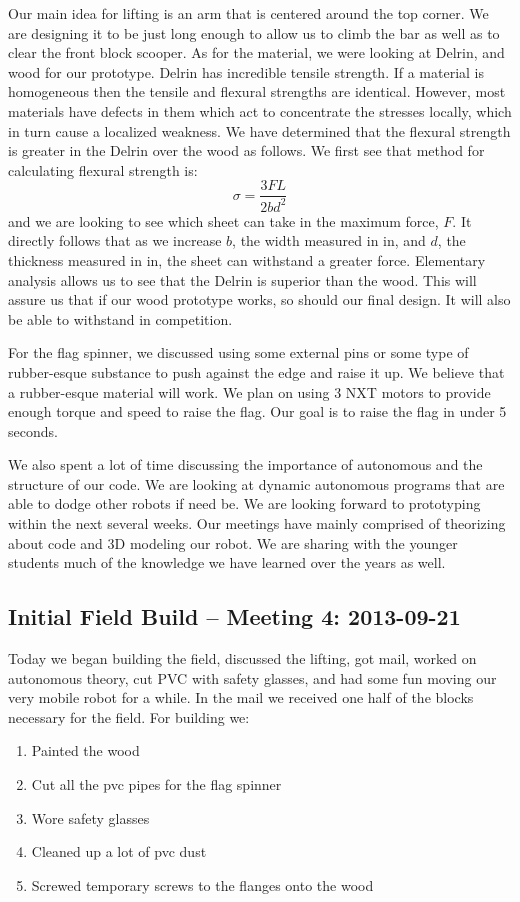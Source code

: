 \documentclass{article}
\begin{document}
Our main idea for lifting is an arm that is centered around the top corner. We are designing it to be just long enough to allow us to climb the bar as well as to clear the front block scooper. As for the material, we were looking at Delrin, and wood for our prototype. Delrin has incredible tensile strength. If a material is homogeneous then the tensile and flexural strengths are identical. However, most materials have defects in them which act to concentrate the stresses locally, which in turn cause a localized weakness. We have determined that the flexural strength is greater in the Delrin over the wood as follows. We first see that method for calculating flexural strength is: \[\sigma = \frac{3FL}{2bd^2}\] and we are looking to see which sheet can take in the maximum force, $F$. It directly follows that as we increase $b$, the width measured in in, and $d$, the  thickness measured in in, the sheet can withstand a greater force. Elementary analysis allows us to see that the Delrin is superior than the wood. This will assure us that if our wood prototype works, so should our final design. It will also be able to withstand in competition. 

For the flag spinner, we discussed using some external pins or some type of rubber-esque substance to push against the edge and raise it up. We believe that a rubber-esque material will work. We plan on using 3 NXT motors to provide enough torque and speed to raise the flag. Our goal is to raise the flag in under 5 seconds. 

We also spent a lot of time discussing the importance of autonomous and the structure of our code. We are looking at dynamic autonomous programs that are able to dodge other robots if need be. We are looking forward to prototyping within the next several weeks. Our meetings have mainly comprised of theorizing about code and 3D modeling our robot. We are sharing with the younger students much of the knowledge we have learned over the years as well. 

\newpage \subsection{Initial Field Build -- Meeting 4: 2013-09-21}
Today we began building the field, discussed the lifting, got mail, worked on autonomous theory, cut PVC with safety glasses, and had some fun moving our very mobile robot for a while.  In the mail we received one half of the blocks necessary for the field.
For building we:
\begin{enumerate}
\item Painted the wood
\item Cut all the pvc pipes for the flag spinner
\item Wore safety glasses
\item Cleaned up a lot of pvc dust
\item Screwed temporary screws to the flanges onto the wood
\end{enumerate}
\end{document}
